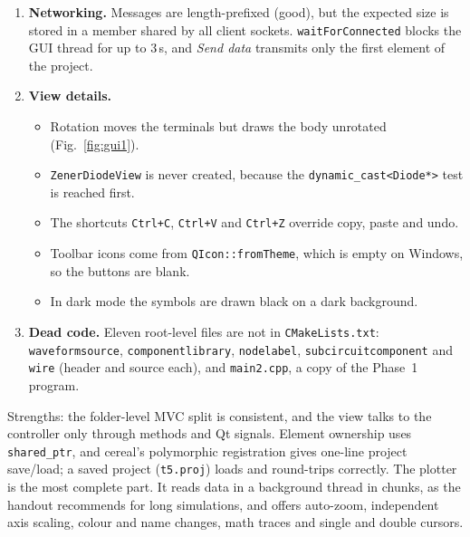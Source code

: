 \begin{enumerate}[leftmargin=2em]
    so the definition aliases the live circuit until it is written to disk.
  \item {} \textbf{Networking.} Messages are length-prefixed (good), but the expected size is stored in a
    member shared by all client sockets. \texttt{waitForConnected} blocks the GUI thread for up to 3\,s, and
    \emph{Send data} transmits only the first element of the project.
  \item {} \textbf{View details.}
    \begin{itemize}
      \item Rotation moves the terminals but draws the body unrotated (Fig.~\ref{fig:gui1}).
      \item \texttt{ZenerDiodeView} is never created, because the \texttt{dynamic\_cast<Diode*>} test is reached first.
      \item The shortcuts \texttt{Ctrl+C}, \texttt{Ctrl+V} and \texttt{Ctrl+Z} override copy, paste and undo.
      \item Toolbar icons come from \texttt{QIcon::fromTheme}, which is empty on Windows, so the buttons are blank.
      \item In dark mode the symbols are drawn black on a dark background.
    \end{itemize}
  \item {} \textbf{Dead code.} Eleven root-level files are not in \texttt{CMakeLists.txt}: \texttt{waveformsource},
    \texttt{componentlibrary}, \texttt{nodelabel}, \texttt{subcircuitcomponent} and \texttt{wire} (header and source each),
    and \texttt{main2.cpp}, a copy of the Phase~1 program.
\end{enumerate}
Strengths: the folder-level MVC split is consistent, and the view talks to the controller only through
methods and Qt signals. Element ownership uses \texttt{shared\_ptr}, and cereal's polymorphic registration
gives one-line project save/load; a saved project (\texttt{t5.proj}) loads and round-trips correctly. The
plotter is the most complete part. It reads data in a background thread in chunks, as the handout
recommends for long simulations, and offers auto-zoom, independent axis scaling, colour and name
changes, math traces and single and double cursors.

